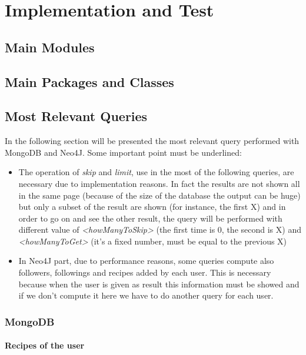 \documentclass[a4paper]{report}
\begin{document}
\chapter{Implementation and Test}
\section{Main Modules}
\section{Main Packages and Classes}
\section{Most Relevant Queries}
In the following section will be presented the most relevant query performed with MongoDB and Neo4J. 
\noindent Some important point must be underlined:
\begin{itemize}
	\item The operation of \emph{skip} and \emph{limit}, use in the most of the following queries, are necessary due  to implementation reasons. In fact the results are not shown all in the same page (because of the size of the database the output can be huge) but only a subset of the result are shown (for instance, the first X) and in order to go on and see the other result, the query will be performed with different value of \emph{<howManyToSkip>} (the first time is 0, the second is X) and \emph{<howManyToGet>} (it's a fixed number, must be equal to the previous X)
	\item In Neo4J part, due to performance reasons, some queries compute also followers, followings and recipes added by each user. This is necessary because when the user is given as result this information must be showed and if we don't compute it here we have to do another query for each user.
\end{itemize}

\subsection{MongoDB}

\subsubsection{Recipes of the user}
\end{document}
